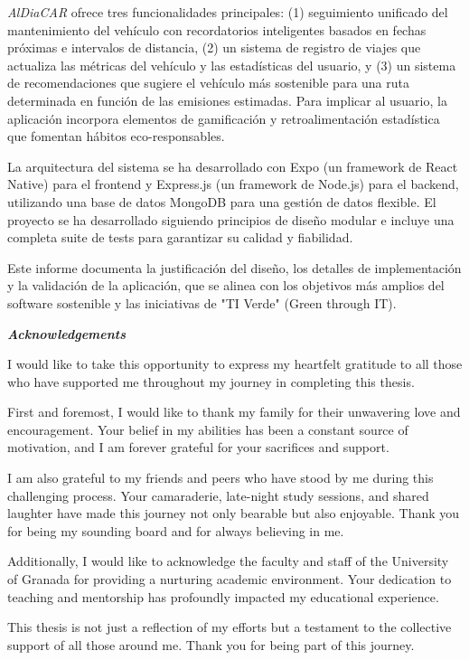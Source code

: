 \textit{AlDiaCAR} ofrece tres funcionalidades principales: (1) seguimiento unificado del mantenimiento del vehículo con recordatorios inteligentes basados en fechas próximas e intervalos de distancia, (2) un sistema de registro de viajes que actualiza las métricas del vehículo y las estadísticas del usuario, y (3) un sistema de recomendaciones que sugiere el vehículo más sostenible para una ruta determinada en función de las emisiones estimadas. Para implicar al usuario, la aplicación incorpora elementos de gamificación y retroalimentación estadística que fomentan hábitos eco-responsables.

\textgap

La arquitectura del sistema se ha desarrollado con Expo (un framework de React Native) para el frontend y Express.js (un framework de Node.js) para el backend, utilizando una base de datos MongoDB para una gestión de datos flexible. El proyecto se ha desarrollado siguiendo principios de diseño modular e incluye una completa suite de tests para garantizar su calidad y fiabilidad.

\textgap

Este informe documenta la justificación del diseño, los detalles de implementación y la validación de la aplicación, que se alinea con los objetivos más amplios del software sostenible y las iniciativas de "TI Verde" (Green through IT).

\clearpage
\mbox{}
\newpage


\begin{center}
    \large\bfseries \textit{Acknowledgements}
\end{center}

I would like to take this opportunity to express my heartfelt gratitude to all those who have supported me throughout my journey in completing this thesis.

\textgap

First and foremost, I would like to thank my family for their unwavering love and encouragement. Your belief in my abilities has been a constant source of motivation, and I am forever grateful for your sacrifices and support.

\textgap

I am also grateful to my friends and peers who have stood by me during this challenging process. Your camaraderie, late-night study sessions, and shared laughter have made this journey not only bearable but also enjoyable. Thank you for being my sounding board and for always believing in me.

\textgap

Additionally, I would like to acknowledge the faculty and staff of the University of Granada for providing a nurturing academic environment. Your dedication to teaching and mentorship has profoundly impacted my educational experience.

\textgap

This thesis is not just a reflection of my efforts but a testament to the collective support of all those around me. Thank you for being part of this journey.

\clearpage
\mbox{}
\newpage
